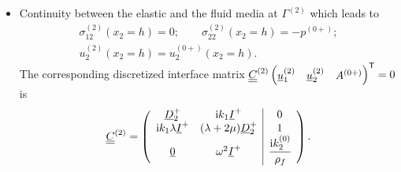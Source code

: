\begin{itemize}
    \begin{equation}
        \nummat C^{(1)+} \numvec s^{(2)} - \nummat C^{(1)-} \numvec s^{(1)} =
        \nummat C^{(1)} \begin{pmatrix} \numvec p^{(1)} & \numvec u^{(1)}_{1} & \numvec u^{(1)}_{2} & \numvec u^{(2)}_{1} & \numvec u^{(2)}_{2}
        \end{pmatrix}^\transp = 0,
    \end{equation}
    are cast as
    \begin{equation} \nummat C^{(1)}  = 
       \left(
        \begin{array}{ccc|cc}
            - N_s\numvec D_{2}^+ & -\im  k_1  N_s \numvec I & \numvec 0 & \mu \numvec D_{2}^- & \im  k_1 \mu \numvec I^- \\
            -\im  k_1 \hat A \numvec I^+ & -\hat P \numvec D_{2}^+ & \phi \left(1 + \cfrac{ Q}{ R}\right) \numvec I^+ & \im  k_1 \lambda\numvec I^- & (\lambda + 2\mu )\numvec D_{2}^-  \\
            \numvec 0 & -\numvec I^+ & \numvec 0 & \numvec I^- & \numvec 0  \\
            \numvec 0 & \numvec 0 & -\numvec I^+ & \numvec 0 & \numvec I^-  \\
            -\cfrac{\phi}{ \rho_{22}} \,\numvec D_{2}^+ & \left( 1 +\displaystyle\frac{ \rho_{12}} { \rho_{22}} \right)\omega^2\numvec I^+ & \numvec 0 & \numvec 0 & \numvec 0 \\
        \end{array} \right),
        \label{eq:poro_elastic_cont_matrix}
    \end{equation}
    with the left-hand side corresponding to $\nummat C^{(1)-}$ and the right-hand side to $\nummat C^{(1)+}$.
    \item Continuity between the elastic and the fluid media at $\Gamma^{(2)}$ which leads to
    \begin{equation}
    \begin{array}{c}
            \sigma_{12}^{(2)}(x_2=h) = 0; \quad \quad \sigma_{22}^{(2)}(x_2=h) = -p^{(0+)}; \\ 
             u_2^{(2)}(x_2=h)=u_2^{(0+)}(x_2=h).
             \end{array}
    \end{equation}
    The corresponding discretized interface matrix $\underline{\underline{C}}^{(2)} \begin{pmatrix} \underline{u}^{(2)}_1 & \underline{u}^{(2)}_2 & A^{(0+)}\end{pmatrix}^\mathsf T = 0$ is 
        \begin{equation} \underline{\underline{C}}^{(2)} = 
            \left( \begin{array}{cc|c}
                    \underline{D}_{2}^+ & \mathrm i  k_1 \underline{I}^+ & 0 \\
                    \mathrm i  k_1 \lambda \underline{I}^+ & (\lambda + 2\mu)\underline{D}_{2}^+ & 1 \\
                    \underline{0} & \omega^2 \underline{I}^+ & \cfrac {\mathrm i k_2^{(0)}}{\rho_f}
                \end{array} \right).
            \label{eq:elastic_fluid_cont_matrix}
        \end{equation}
    \end{itemize}
    
